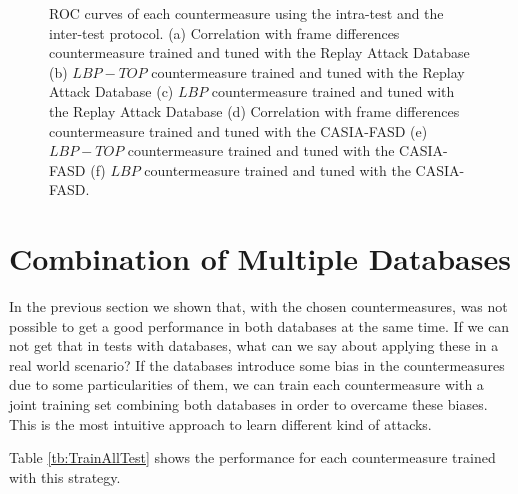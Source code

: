 \begin{figure}[ht]
\begin{center}
\caption{ROC curves of each countermeasure using the intra-test and the inter-test protocol. (a) Correlation with frame differences countermeasure trained and tuned with the Replay Attack Database (b) $LBP-TOP$ countermeasure trained and tuned with the Replay Attack Database (c) $LBP$ countermeasure trained and tuned with the Replay Attack Database (d) Correlation with frame differences countermeasure trained and tuned with the CASIA-FASD (e) $LBP-TOP$ countermeasure trained and tuned with the CASIA-FASD (f) $LBP$ countermeasure trained and tuned with the CASIA-FASD.} 
\label{fig:ROC_cross}
\end{center}
\end{figure}


\section{Combination of Multiple Databases}
\label{sec:combination}

In the previous section we shown that, with the chosen countermeasures, was not possible to get a good performance in both databases at the same time. If we can not get that in tests with databases, what can we say about applying these in a real world scenario? If the databases introduce some bias in the countermeasures due to some particularities of them, we can train each countermeasure with a joint training set combining both databases in order to overcame these biases. This is the most intuitive approach to learn different kind of attacks. 

Table \ref{tb:TrainAllTest} shows the performance for each countermeasure trained with this strategy. %

